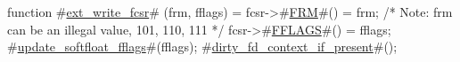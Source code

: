 function #\hyperref[sailRISCVzextzywritezyfcsr]{ext\_write\_fcsr}# (frm, fflags) = {
  fcsr->#\hyperref[sailRISCVzFRM]{FRM}#()    = frm;      /* Note: frm can be an illegal value, 101, 110, 111 */
  fcsr->#\hyperref[sailRISCVzFFLAGS]{FFLAGS}#() = fflags;
  #\hyperref[sailRISCVzupdatezysoftfloatzyfflags]{update\_softfloat\_fflags}#(fflags);
  #\hyperref[sailRISCVzdirtyzyfdzycontextzyifzypresent]{dirty\_fd\_context\_if\_present}#();
}
